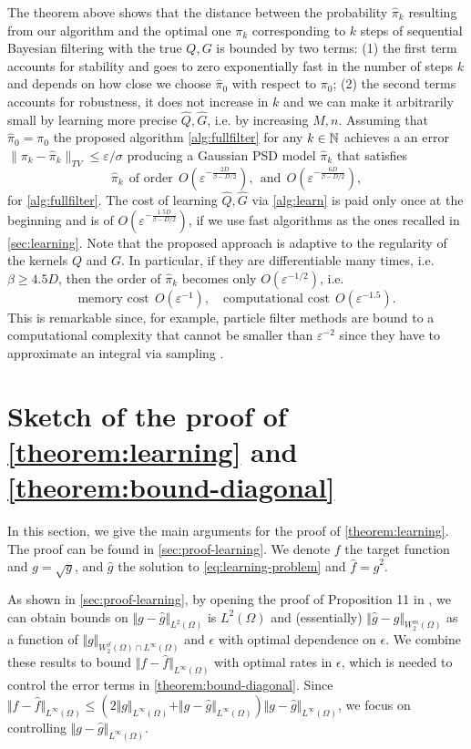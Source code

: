The theorem above shows that the distance between the probability $\hat \pi_k$ resulting from our algorithm and the optimal one $\pi_k$ corresponding to $k$ steps of sequential Bayesian filtering with the true $Q, G$ is bounded by two terms: (1)
the first term accounts for stability and goes to zero exponentially fast in the number of steps $k$ and depends on how close we choose $\hat{\pi}_0$ with respect to $\pi_0$; (2) the second terms accounts for robustness, it does not increase in $k$ and we can make it arbitrarily small by learning more precise $\hat{Q}, \hat{G}$, i.e. by increasing $M, n$. Assuming that $\hat{\pi}_0 = \pi_0$ the proposed algorithm \cref{alg:fullfilter} for any $k \in\mathbb N$ achieves a
an error $\|\pi_k - \hat{\pi}_k\|_{TV} \leq \varepsilon/\sigma$ producing a Gaussian PSD model $\hat{\pi}_k$ that satisfies
$$ \hat{\pi}_k ~~\textrm{of order}~~  O(\varepsilon^{-\frac{2D}{\beta - D/2}}), ~~\textrm{and} ~~ O(\varepsilon^{-\frac{6D}{\beta - D/2}}),$$
for \cref{alg:fullfilter}. The cost of learning $\hat{Q}, \hat{G}$ via \cref{alg:learn} is paid only once at the beginning and is of $O(\varepsilon^{-\frac{1.5D}{\beta - D/2}})$, if we use fast algorithms as the ones recalled in \cref{sec:learning}. Note that the proposed approach is adaptive to the regularity of the kernels $Q$ and $G$. In particular, if they are differentiable many times, i.e. $\beta \geq 4.5 D$, then the order of $\hat{\pi}_k$ becomes only  $O(\varepsilon^{-1/2})$, i.e.
$$
\textrm{memory cost} ~~ O(\varepsilon^{-1}), \quad \textrm{computational cost} ~~ O(\varepsilon^{-1.5}).
$$
%
This is remarkable since, for example, particle filter methods are bound to a computational complexity that cannot be smaller than $\varepsilon^{-2}$ since they have to approximate an integral via sampling \citep{oudjane}.

\section{Sketch of the proof of \cref{theorem:learning} and \cref{theorem:bound-diagonal}}\label{sec:sketches}
In this section, we give the main arguments for the proof of \cref{theorem:learning}. The proof can be found in \cref{sec:proof-learning}. We denote $f$ the target function and $g = \sqrt{g}$, and $\hat g$ the solution to \cref{eq:learning-problem} and $\hat f = \hat g^2$.

As shown in \cref{sec:proof-learning}, by opening the proof of Proposition 11 in \cite{sampling-ulysse}, we can obtain bounds on $\Vert g - \hat g \Vert_{L^2(\Omega)}$ is $L^2(\Omega)$ and (essentially) $\Vert \hat g - g\Vert_{W^m_2(\Omega)}$ as a function of $\Vert g\Vert_{W^\beta_2(\Omega)\cap L^\infty(\Omega)}$ and $\epsilon$ with optimal dependence on $\epsilon$. We combine these results to bound $\Vert f - \hat f\Vert_{L^\infty(\Omega)}$ with optimal rates in $\epsilon$, which is needed to control the error terms in \cref{theorem:bound-diagonal}.
Since $\Vert f - \hat f\Vert_{L^\infty(\Omega)}\leq \left(2\Vert g\Vert_{L^\infty(\Omega)}+ \Vert g - \hat g\Vert_{L^\infty(\Omega)} \right)\Vert g- \hat g\Vert_{L^\infty(\Omega)}$, we focus on controlling $\Vert g - \hat g \Vert_{L^\infty(\Omega)}$.

